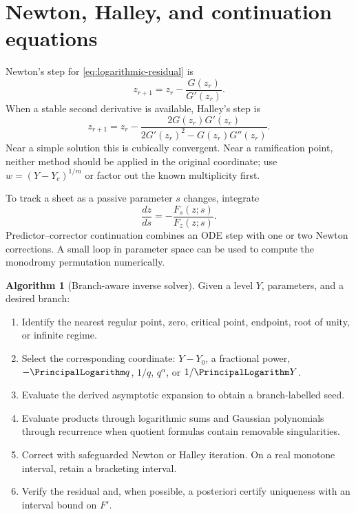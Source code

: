 \documentclass[11pt,a4paper,oneside,openany]{book}
\theoremstyle{definition}
\newtheorem{algorithm}[theorem]{Algorithm}
\theoremstyle{remark}
\begin{document}
\section{Newton, Halley, and continuation equations}

Newton's step for \eqref{eq:logarithmic-residual} is
\begin{equation}\label{eq:log-newton}
 z_{r+1}=z_r-\frac{G(z_r)}{G'(z_r)}.
\end{equation}
When a stable second derivative is available, Halley's step is
\begin{equation}\label{eq:log-halley}
 z_{r+1}=z_r-
 \frac{2G(z_r)G'(z_r)}{2G'(z_r)^2-G(z_r)G''(z_r)}.
\end{equation}
Near a simple solution this is cubically convergent.  Near a ramification
point, neither method should be applied in the original coordinate; use
\(w=(Y-Y_c)^{1/m}\) or factor out the known multiplicity first.

To track a sheet as a passive parameter \(s\) changes, integrate
\begin{equation}\label{eq:continuation-ode}
 \frac{dz}{ds}=-\frac{F_s(z;s)}{F_z(z;s)}.
\end{equation}
Predictor--corrector continuation combines an ODE step with one or two Newton
corrections.  A small loop in parameter space can be used to compute the
monodromy permutation numerically.

\begin{algorithm}[Branch-aware inverse solver]\label{alg:branch-aware-solver}
Given a level \(Y\), parameters, and a desired branch:
\begin{enumerate}[label=\arabic*.]
\item Identify the nearest regular point, zero, critical point, endpoint, root
of unity, or infinite regime.
\item Select the corresponding coordinate: \(Y-Y_0\), a fractional power,
\(-\PrincipalLogarithm q\), \(1/q\), \(q^\alpha\), or \(1/\PrincipalLogarithm Y\).
\item Evaluate the derived asymptotic expansion to obtain a branch-labelled
seed.
\item Evaluate products through logarithmic sums and Gaussian polynomials
through recurrence when quotient formulas contain removable singularities.
\item Correct with safeguarded Newton or Halley iteration.  On a real monotone
interval, retain a bracketing interval.
\item Verify the residual and, when possible, a posteriori certify uniqueness
with an interval bound on \(F'\).
\end{enumerate}
\end{algorithm}
\end{document}
